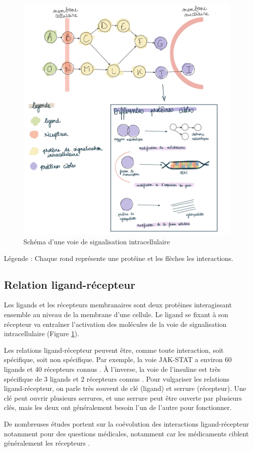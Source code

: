 \begin{figure}[H]
    \centering
    \includegraphics[width=1\textwidth]{figures/corps/figure12.png}
    \caption{Schéma d'une voie de signalisation intracellulaire}
    \label{fig:12_signa}
\end{figure}
Légende : Chaque rond représente une protéine et les flèches les interactions.  \newpage

\subsection{Relation ligand-récepteur}\label{ligrec}
\par Les ligands et les récepteurs membranaires sont deux protéines interagissant ensemble au niveau de la membrane d’une cellule. Le ligand se fixant à son récepteur va entraîner l’activation des molécules de la voie de signalisation intracellulaire (Figure \ref{fig:12_signa}).
\par Les relations ligand-récepteur peuvent être, comme toute interaction, soit spécifique, soit non spécifique. Par exemple, la voie JAK-STAT a environ 60 ligands et 40 récepteurs connus \parencite{darnell_jak-stat_1994}. À l’inverse, la voie de l’insuline est très spécifique de 3 ligands et 2 récepteurs connus \parencite{leroith_insulin-like_2021}. Pour vulgariser les relations ligand-récepteur, on parle très souvent de clé (ligand) et serrure (récepteur). Une clé peut ouvrir plusieurs serrures, et une serrure peut être ouverte par plusieurs clés, mais les deux ont généralement besoin l’un de l’autre pour fonctionner. 
\par De nombreuses études portent sur la coévolution des interactions ligand-récepteur notamment pour des questions médicales, notamment car les médicaments ciblent généralement les récepteurs \parencite{de_jong_receptor-ligand_2005, pluder_proteome_2006, woolhouse_biological_2002}. 


